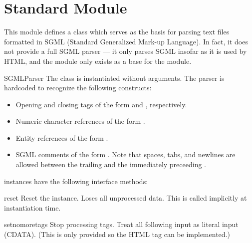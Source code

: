 \section{Standard Module }
\label{module-sgmllib}

This module defines a class  which serves as the
basis for parsing text files formatted in SGML (Standard Generalized
Mark-up Language).  In fact, it does not provide a full SGML parser
--- it only parses SGML insofar as it is used by HTML, and the module
only exists as a base for the 
module.


\begin{classdesc}{SGMLParser}{}
The  class is instantiated without arguments.
The parser is hardcoded to recognize the following
constructs:

\begin{itemize}
\item
Opening and closing tags of the form
 and
, respectively.

\item
Numeric character references of the form .

\item
Entity references of the form .

\item
SGML comments of the form .  Note that
spaces, tabs, and newlines are allowed between the trailing
\samp{>} and the immediately preceeding \samp{--}.

\end{itemize}
\end{classdesc}

 instances have the following interface methods:


\begin{funcdesc}{reset}{}
Reset the instance.  Loses all unprocessed data.  This is called
implicitly at instantiation time.
\end{funcdesc}

\begin{funcdesc}{setnomoretags}{}
Stop processing tags.  Treat all following input as literal input
(CDATA).  (This is only provided so the HTML tag 
can be implemented.)
\end{funcdesc}

